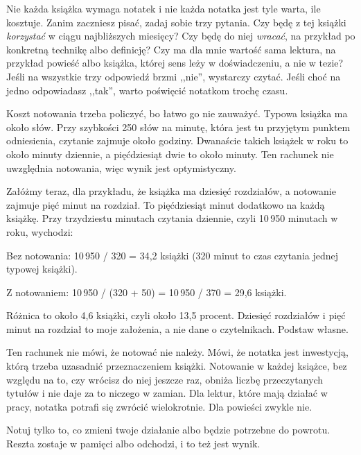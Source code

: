 Nie każda książka wymaga notatek i nie każda notatka jest tyle warta, ile kosztuje. Zanim zaczniesz pisać, zadaj sobie trzy pytania. Czy będę z tej książki \emph{korzystać} w ciągu najbliższych miesięcy? Czy będę do niej \emph{wracać}, na przykład po konkretną technikę albo definicję? Czy ma dla mnie wartość sama lektura, na przykład powieść albo książka, której sens leży w doświadczeniu, a nie w tezie? Jeśli na wszystkie trzy odpowiedź brzmi ,,nie'', wystarczy czytać. Jeśli choć na jedno odpowiadasz ,,tak'', warto poświęcić notatkom trochę czasu.

Koszt notowania trzeba policzyć, bo łatwo go nie zauważyć. Typowa książka ma około  słów. Przy szybkości 250 słów na minutę, która jest tu przyjętym punktem odniesienia, czytanie zajmuje około  godziny. Dwanaście takich książek w roku to około  minuty dziennie, a pięćdziesiąt dwie to około  minuty. Ten rachunek nie uwzględnia notowania, więc wynik jest optymistyczny.

Załóżmy teraz, dla przykładu, że książka ma dziesięć rozdziałów, a notowanie zajmuje pięć minut na rozdział. To pięćdziesiąt minut dodatkowo na każdą książkę. Przy trzydziestu minutach czytania dziennie, czyli 10\,950 minutach w roku, wychodzi:
\begin{przyklad}
Bez notowania: 10\,950 / 320 = 34,2 książki (320 minut to czas czytania jednej typowej książki).

Z notowaniem: 10\,950 / (320 + 50) = 10\,950 / 370 = 29,6 książki.

Różnica to około 4,6 książki, czyli około 13,5 procent. Dziesięć rozdziałów i pięć minut na rozdział to moje założenia, a nie dane o czytelnikach. Podstaw własne.
\end{przyklad}

Ten rachunek nie mówi, że notować nie należy. Mówi, że notatka jest inwestycją, którą trzeba uzasadnić przeznaczeniem książki. Notowanie w każdej książce, bez względu na to, czy wrócisz do niej jeszcze raz, obniża liczbę przeczytanych tytułów i nie daje za to niczego w zamian. Dla lektur, które mają działać w pracy, notatka potrafi się zwrócić wielokrotnie. Dla powieści zwykle nie.

\begin{zasada}
Notuj tylko to, co zmieni twoje działanie albo będzie potrzebne do powrotu. Reszta zostaje w pamięci albo odchodzi, i to też jest wynik.
\end{zasada}

